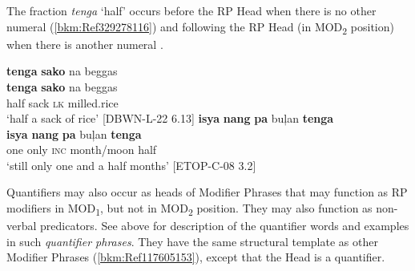 The fraction \textit{tenga} ‘half’ occurs before the RP Head when there is no other numeral (\ref{bkm:Ref329278116}) and following the RP Head (in MOD\textsubscript{2} position) when there is another numeral .

\ea
\label{bkm:Ref329278116}
\textbf{tenga}  \textbf{sako}   na  beggas \\\smallskip
 \gll \textbf{tenga}  \textbf{sako}   na  beggas \\
half  sack  \textsc{lk}  milled.rice \\
\glt ‘half a sack of rice’ [DBWN-L-22 6.13]
\z
\ea
\label{bkm:Ref329278135}
\textbf{isya}  \textbf{nang}  \textbf{pa}   buļan  \textbf{tenga} \\\smallskip
 \gll \textbf{isya}  \textbf{nang}  \textbf{pa}   buļan  \textbf{tenga} \\
one  only  \textsc{inc}  month/moon  half \\
\glt ‘still only one and a half months’ [ETOP-C-08 3.2]
\z

Quantifiers may also occur as heads of Modifier Phrases that may function as RP modifiers in MOD\textsubscript{1}, but not in MOD\textsubscript{2} position. They may also function as non-verbal predicators. See  above for description of the quantifier words and examples in such \textit{quantifier phrases}. They have the same structural template as other Modifier Phrases (\ref{bkm:Ref117605153}), except that the Head is a quantifier.

